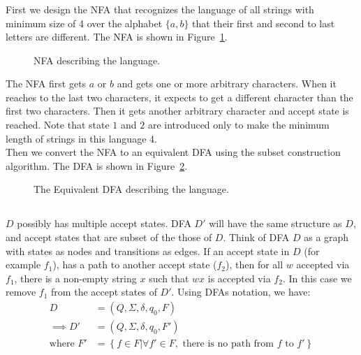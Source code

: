 \documentclass{article}
\numberwithin{equation}{subsection}
\begin{document}
\subsubsection{}
First we design the NFA that recognizes the language of all strings with minimum size of 4 over the alphabet $\{a,b\}$ that their first and second to last letters are different.
The NFA is shown in Figure~\ref{fig:automata1-1-2-a}.
\begin{figure}[H]
\centering

\caption{NFA describing the language.}
\label{fig:automata1-1-2-a}
\end{figure}
The NFA first gets \(a\) or \(b\) and gets one or more arbitrary characters.
When it reaches to the last two characters, it expects to get a different character than the first two characters.
Then it gets another arbitrary character and accept state is reached.
Note that state \(1\) and \(2\) are introduced only to make the minimum length of strings in this language 4.\\
Then we convert the NFA to an equivalent DFA using the subset construction algorithm.
The DFA is shown in Figure~\ref{fig:automata1-1-2-b}.
\begin{figure}[H]
\centering

\caption{The Equivalent DFA describing the language.}
\label{fig:automata1-1-2-b}
\end{figure}

\subsection{}
\(D\) possibly has multiple accept states.
DFA \(D'\) will have the same structure as \(D\), and accept states that are subset of the those of \(D\).
Think of DFA \(D\) as a graph with states as nodes and transitions as edges.
If an accept state in \(D\) (for example \(f_1\)), has a path to another accept state (\(f_2\)), then for all \(w\) accepted via \(f_1\), there is a non-empty string \(x\) such that \(w x\) is accepted via \(f_2\).
In this case we remove \(f_1\) from the accept states of \(D'\).
Using DFAs notation, we have:
\begin{align}
D &= (Q, \Sigma, \delta, q_0, F)\\
\implies D' &= (Q, \Sigma, \delta, q_0, F')\\
\text{where } F' &= \left\{f \in F | \forall f' \in F, \text{ there is no path from } f \text{ to } f' \right\}
\end{align}

\subsection{}
\end{document}
